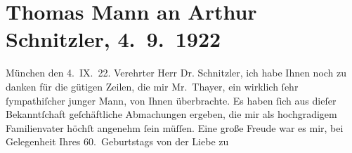 

         
         \newcommand{\erwaehntePersonen}{Personen: Scofield Thayer}
         \newcommand{\erwaehnteOrte}{Orte: München, Niederlande, Wien}
         \newcommand{\erwaehnteWerke}{Werke: Arthur Schnitzler. Zu seinem sechzigsten Geburtstag (15. Mai 1922), Betrachtungen eines Unpolitischen, Casanovas Heimfahrt, Der Zauberberg. Roman, Die neue Rundschau, Von deutscher Republik. Gerhart Hauptmann zum sechzigsten Geburtstag, Wilhelm Meister}
               \section[Thomas Mann an Arthur Schnitzler, 4. 9. 1922]{ Thomas Mann an Arthur Schnitzler, 4. 9. 1922}\nopagebreak{}\rehead{ }\begin{ledgroupsized}[t]{13cm}\normalsize\beginnumbering \toendnotes[C]{\smallbreak\pagebreak[2]} 
\toendnotes[C]{\smallbreak}\pstart
           \raggedleft{}{\pb}München den 4. IX. 22.\pend
           \pstart{}Verehrter Herr Dr. Schnitzler,\pend\pstart
           ich habe Ihnen noch zu danken für die gütigen Zeilen, die mir Mr. Thayer, ein wirklich ſehr ſympathiſcher junger Mann, von Ihnen
               überbrachte. Es haben ſich aus dieſer Bekanntſchaft geſchäftliche Abmachungen
               ergeben, die mir als hochgradigem Familienvater höchſt angenehm ſein müſſen.\pend
           \pstart
           Eine große Freude war es mir, bei Gelegenheit Ihres 60. Geburtstags von der Liebe zu

\end{ledgroupsized}
